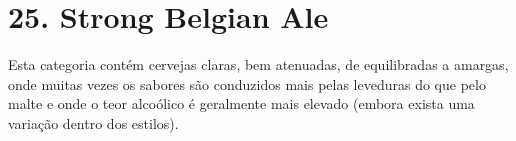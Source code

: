 \section*{25. Strong Belgian Ale}

Esta categoria contém cervejas claras, bem atenuadas, de equilibradas a amargas, onde muitas vezes os sabores são conduzidos mais pelas leveduras do que pelo malte e onde o teor alcoólico é geralmente mais elevado (embora exista uma variação dentro dos estilos).